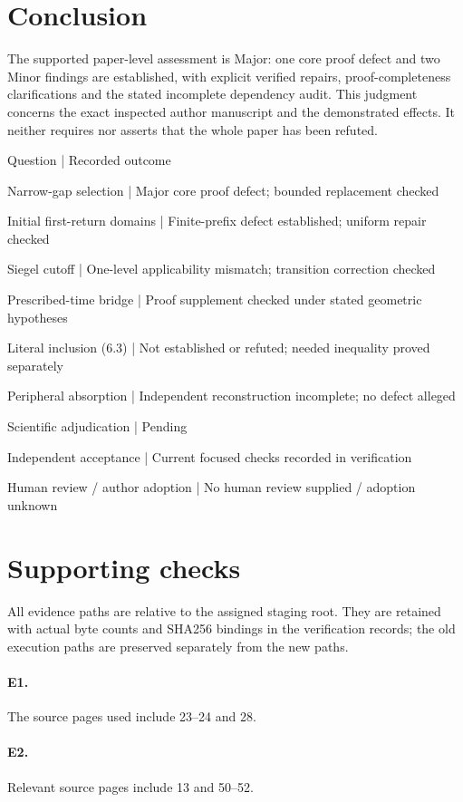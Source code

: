 \documentclass[10pt]{article}
\begin{document}
\section*{Conclusion}
The supported paper-level assessment is Major: one core proof defect and two Minor findings are established, with explicit verified repairs, proof-completeness clarifications and the stated incomplete dependency audit. This judgment concerns the exact inspected author manuscript and the demonstrated effects. It neither requires nor asserts that the whole paper has been refuted.\par
Question | Recorded outcome\par
Narrow-gap selection | Major core proof defect; bounded replacement checked\par
Initial first-return domains | Finite-prefix defect established; uniform repair checked\par
Siegel cutoff | One-level applicability mismatch; transition correction checked\par
Prescribed-time bridge | Proof supplement checked under stated geometric hypotheses\par
Literal inclusion (6.3) | Not established or refuted; needed inequality proved separately\par
Peripheral absorption | Independent reconstruction incomplete; no defect alleged\par
Scientific adjudication | Pending\par
Independent acceptance | Current focused checks recorded in verification\par
Human review / author adoption | No human review supplied / adoption unknown\par
\section*{Supporting checks}
All evidence paths are relative to the assigned staging root. They are retained with actual byte counts and SHA256 bindings in the verification records; the old execution paths are preserved separately from the new paths.\par
\paragraph*{E1.}\mbox{}\par
The source pages used include 23–24 and 28.\par
\paragraph*{E2.}\mbox{}\par
Relevant source pages include 13 and 50–52.\par
\end{document}
